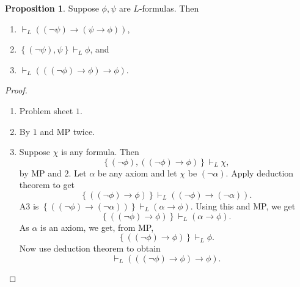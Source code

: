 \documentclass{article}
\newcommand{\rb}[1]{\left( #1 \right)}
\newcommand{\cb}[1]{\left\{ #1 \right\}}
\newcommand{\notb}[1]{\rb{\neg #1}}
\newcommand{\impb}[2]{\rb{#1 \rightarrow #2}}
\theoremstyle{definition}\newtheorem{definition}{Definition}[subsection]
\theoremstyle{definition}\newtheorem{remark1}[definition]{Remark}
\theoremstyle{definition}\newtheorem{example1}[definition]{Example}
\theoremstyle{definition}\newtheorem*{remark2}{Remark}
\theoremstyle{definition}\newtheorem*{example2}{Example}
\theoremstyle{definition}\newtheorem*{note}{Note}
\theoremstyle{definition}\newtheorem*{notation}{Notation}
\newtheorem{proposition}[definition]{Proposition}
\begin{document}
\begin{proposition}
\label{prop:1.2.7}
Suppose $ \phi, \psi $ are $ L $-formulas. Then
\begin{enumerate}
\item $ \vdash_L \impb{\notb{\psi}}{\impb{\psi}{\phi}} $,
\item $ \cb{\notb{\psi}, \psi} \vdash_L \phi $, and
\item $ \vdash_L \impb{\impb{\notb{\phi}}{\phi}}{\phi} $.
\end{enumerate}
\end{proposition}

\begin{proof}
\hfill
\begin{enumerate}
\item Problem sheet $ 1 $.
\item By $ 1 $ and MP twice.
\item Suppose $ \chi $ is any formula. Then
$$ \cb{\notb{\phi}, \impb{\notb{\phi}}{\phi}} \vdash_L \chi, $$
by MP and $ 2 $. Let $ \alpha $ be any axiom and let $ \chi $ be $ \notb{\alpha} $. Apply deduction theorem to get
$$ \cb{\impb{\notb{\phi}}{\phi}} \vdash_L \impb{\notb{\phi}}{\notb{\alpha}}. $$
A3 is $ \cb{\impb{\notb{\phi}}{\notb{\alpha}}} \vdash_L \impb{\alpha}{\phi} $. Using this and MP, we get
$$ \cb{\impb{\notb{\phi}}{\phi}} \vdash_L \impb{\alpha}{\phi}. $$
As $ \alpha $ is an axiom, we get, from MP,
$$ \cb{\impb{\notb{\phi}}{\phi}} \vdash_L \phi. $$
Now use deduction theorem to obtain
$$ \vdash_L \impb{\impb{\notb{\phi}}{\phi}}{\phi}. $$
\end{enumerate}
\end{proof}

\pagebreak
\end{document}
